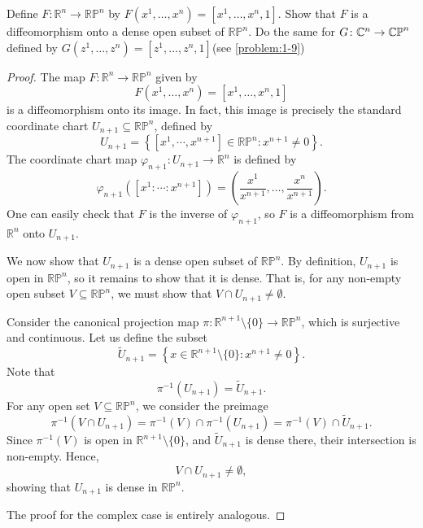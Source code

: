 \begin{problem}
    Define $F \colon \mathbb{R}^n \to \mathbb{RP}^n$  by $F(x^1, \dots, x^n) = [x^1 , \dots , x^n , 1]$.
    Show that $F$ is a diffeomorphism onto a dense open subset of $\mathbb{RP}^n$. Do the same for $G \colon \mathbb{C}^n \to \mathbb{CP}^n$ defined by $G(z^1, \dots, z^n) = [z^1 , \dots , z^n , 1]$(see \cref{problem:1-9})

    \begin{proof}
        The map \( F \colon \mathbb{R}^n \to \mathbb{RP}^n \) given by  
        \[
            F(x^1, \dots, x^n) = [x^1, \dots, x^n, 1]
        \]
        is a diffeomorphism onto its image. In fact, this image is precisely the standard coordinate chart \( U_{n+1} \subseteq \mathbb{RP}^n \), defined by
        \[
            U_{n+1} = \left\{ [x^1 , \cdots , x^{n+1}] \in \mathbb{RP}^n \colon x^{n+1} \neq 0 \right\}.
        \]
        The coordinate chart map \( \varphi_{n+1} \colon U_{n+1} \to \mathbb{R}^n \) is defined by
        \[
            \varphi_{n+1}([x^1 : \cdots : x^{n+1}]) = \left( \frac{x^1}{x^{n+1}}, \dots, \frac{x^n}{x^{n+1}} \right).
        \]
        One can easily check that \( F \) is the inverse of \( \varphi_{n+1} \), so \( F \) is a diffeomorphism from \( \mathbb{R}^n \) onto \( U_{n+1} \).

        We now show that \( U_{n+1} \) is a dense open subset of \( \mathbb{RP}^n \). By definition, \( U_{n+1} \) is open in \( \mathbb{RP}^n \), so it remains to show that it is dense. That is, for any non-empty open subset \( V \subseteq \mathbb{RP}^n \), we must show that \( V \cap U_{n+1} \neq \emptyset \).

        Consider the canonical projection map \( \pi \colon \mathbb{R}^{n+1} \setminus \{0\} \to \mathbb{RP}^n \), which is surjective and continuous. Let us define the subset
        \[
            \tilde{U}_{n+1} = \left\{ x \in \mathbb{R}^{n+1} \setminus \{0\} \colon x^{n+1} \neq 0 \right\}.
        \]
        Note that
        \[
            \pi^{-1}(U_{n+1}) = \tilde{U}_{n+1}.
        \]
        For any open set \( V \subseteq \mathbb{RP}^n \), we consider the preimage
        \[
            \pi^{-1}(V \cap U_{n+1}) = \pi^{-1}(V) \cap \pi^{-1}(U_{n+1}) = \pi^{-1}(V) \cap \tilde{U}_{n+1}.
        \]
        Since \( \pi^{-1}(V) \) is open in \( \mathbb{R}^{n+1} \setminus \{0\} \), and \( \tilde{U}_{n+1} \) is dense there, their intersection is non-empty. Hence,
        \[
            V \cap U_{n+1} \neq \emptyset,
        \]
        showing that \( U_{n+1} \) is dense in \( \mathbb{RP}^n \).

        The proof for the complex case is entirely analogous.
    \end{proof}
\end{problem}

